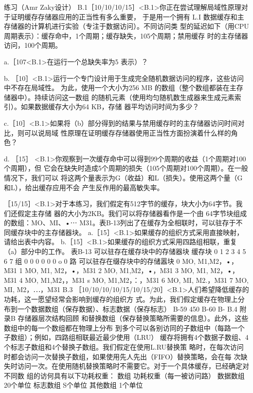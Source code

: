 练习（Amr Zaky设计）
B.1［10/10/10/15］<B.1>你正在尝试理解局域性原理对于证明缓存存储器应用的正当性有多么重要，
于是用一个拥有 L.I 数据缓存和主存储器的计算机进行实验（专注于数据访问）。不同访问类
型的延迟如下（用CPU周期表示）：缓存命中，1个周期；缓存缺失，105个周期；禁用缓存
时的主存储器访问，100个周期。

a.［107<B.1>在运行一个总缺失率为5%
表示）？

b. ［10］<B.1>运行一个专门设计用于生成完全随机数据访问的程序，这些访问中不存在局域性。
为此，使用一个大小为256 MB 的数组（整个数组都装在主存储器中）。持续访问这一数组
的随机元素（使用均匀随机数生成器来生成元素索引）。如果数据缓存大小为64 KB，存储
器平均访问时间为多少？

c.［10］<B.1>如果将（b）部分得到的结果与禁用缓存时的主存储器访问时间对比，则可以说局域
性原理在证明缓存存储器使用正当性方面扮演着什么样的角色？

d. ［15］ <B.1>你观察到一次缓存命中可以得到99个周期的收益（1个周期对100个周期），但
它会在缺失时造成5个周期的损失（105个周期对100个周期）。在一般情况下，我们可以
将这两个量表示为G（收益）和L（损失）。使用这两个量（G和L），给出缓存应用不会
产生反作用的最高敏失率。

［15/15］<B.1>对于本练习，我们假定有512字节的缓存，块大小为64字节。我们还假定主存储
器的大小为2KB。我们可以将存储器看作是一个由 64字节块组成的数组：MO、MI、•⋯
M31。表B-13列出了在缓存为全相联时，可以驻存于不同缓存块中的主存储器块。
a.［15］<B.1>如果缓存的组织方式采用直接映射，请给出表中内容。
b.［15］<B.1>如果缓存的组织方式采用四路组相联，重复（a）部分中的工作。
表B-13 可以驻存在缓存块中的存储器块
缓存块
0
1
2
3
4
5
6
7
组
0
0
0
0
0
0
o
0
路
可以驻存在缀存块中的存储嚣块
0
MO, M1,M2，•，M31
1
MO, M1, M2，•，M31
2
MO, M1,M2，•，M31
3
MO, M1, M2，•，M31
4
MO, M1,M2，，M31
s
MO, M1,M2，：，M31
6
MO, MI, M2.，M31
7
MO, MI, M2，⋯，M31
B.3 ［10/10/10/10/15/10/15/20］<B.1>人们希望降低缓存的功耗，这一愿望经常会影响到缓存的组织方
式。为此，我们假定缓存在物理上分布到一个数据数组（保存数据）、标志数据（保存标志）
B-59
450
B-60
B-
B.4
附录B 存储器层次结构回顾
和替换数组（保存替换策略所需要的信息）。此外，这些数组中的每一个数组都在物理上分布
到多个可以各别访同的子数组中（每路一个子数组）；例如，四路组相联最近最少使用（LRU）
缓存将拥有4个数据子数组、4个标志子数组和4个替换子数组。我们假定在使用L.RU替换策
略时，在每次访问时都会访问一次替换子数组，如果使用先人先出（FIFO）替换策略，会在每
次缺失时访问一次。在使用随机替换策略时不需要它。对于一个具体缓存，已经确定对不同数
组的访何具有以下功耗权重：
数组
功耗权重（每一被访问路）
数据数组
20个单位
标志数组
S个单位
其他数组
1个单位


